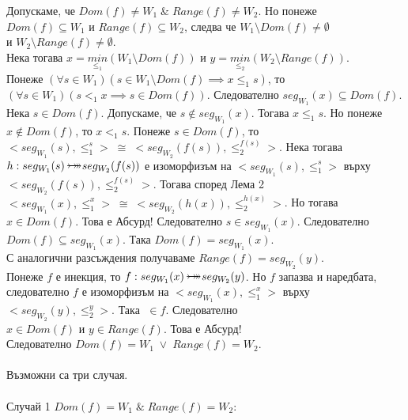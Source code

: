 \documentclass[12pt]{article}
\newcommand{\bijection}[0]{\mathbin{\mathlarger{\mathlarger{\rightarrowtail}} \hspace{-14pt} \mathlarger{\mathlarger{\twoheadrightarrow}}}}
\begin{document}
Допускаме, че \(Dom(f) \neq W_1 \; \& \; Range(f) \neq W_2\). Но понеже
\\
\(Dom(f) \subseteq W_1\) и \(Range(f) \subseteq W_2\),
следва че \(W_1 \setminus Dom(f) \neq \emptyset\)
\\
и \(W_2 \setminus Range(f) \neq \emptyset\).
\\
Нека тогава \(x = \underset{\leq_1}{min}(W_1 \setminus Dom(f))\)
и \(y = \underset{\leq_2}{min}(W_2 \setminus Range(f))\).
\\
Понеже \((\forall s \in W_1) (s \in W_1 \setminus Dom(f) \implies x \leq_1 s)\), то
\\
\((\forall s \in W_1) (s <_1 x \implies s \in Dom(f))\).
Следователно \(seg_{W_1}(x) \subseteq Dom(f)\).
Нека \(s \in Dom(f)\). Допускаме, че \(s \notin seg_{W_1}(x)\).
Тогава \(x \leq_1 s\). Но понеже \(x \notin Dom(f)\), то \(x <_1 s\).
Понеже \(s \in Dom(f)\), то
\\
\(<seg_{W_1}(s), \leq_1^s> \; \cong \; <seg_{W_2}(f(s)), \leq_2^{f(s)}>\).
Нека тогава
\\
\(h : seg_{W_1}(s) \bijection seg_{W_2}(f(s))\)
е изоморфизъм на
\(<seg_{W_1}(s), \leq_1^s>\) върху \(<seg_{W_2}(f(s)), \leq_2^{f(s)}>\).
Тогава според Лема 2
\\
\(<seg_{W_1}(x), \leq_1^x> \; \cong \; <seg_{W_2}(h(x)), \leq_2^{h(x)}>\).
Но тогава \(x \in Dom(f)\). Това е Абсурд!
Следователно \(s \in seg_{W_1}(x)\).
Следователно \(Dom(f) \subseteq seg_{W_1}(x)\).
Така \(Dom(f) = seg_{W_1}(x)\).
\\
С аналогични разсъждения получаваме \(Range(f) = seg_{W_2}(y)\).
\\
Понеже \(f\) е инекция, то \(f : seg_{W_1}(x) \bijection seg_{W_2}(y)\).
Но \(f\) запазва и наредбата, следователно \(f\) е изоморфизъм на
\(<seg_{W_1}(x), \leq_1^x>\) върху
\\
\(<seg_{W_2}(y), \leq_2^{y}>\).
Така \(<x, y> \; \in f\).
Следователно
\\
\(x \in Dom(f)\) и \(y \in Range(f)\).
Това е Абсурд!
\\
Следователно \(Dom(f) = W_1 \; \lor \; Range(f) = W_2\).
\\
\vspace{1mm}
\\
Възможни са три случая.
\\
\vspace{1mm}
\\
Случай 1 \(Dom(f) = W_1 \; \& \; Range(f) = W_2\):
\\
\vspace{1mm}
\end{document}
